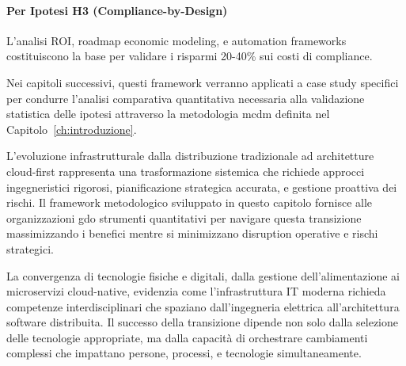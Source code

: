 \paragraph{Per Ipotesi H3 (Compliance-by-Design)}
L'analisi ROI, roadmap economic modeling, e automation frameworks costituiscono la base per validare i risparmi 20-40\% sui costi di compliance.

Nei capitoli successivi, questi framework verranno applicati a case study specifici per condurre l'analisi comparativa quantitativa necessaria alla validazione statistica delle ipotesi attraverso la metodologia \gls{mcdm} definita nel Capitolo~\ref{ch:introduzione}.

\vspace{1cm}

L'evoluzione infrastrutturale dalla distribuzione tradizionale ad architetture cloud-first rappresenta una trasformazione sistemica che richiede approcci ingegneristici rigorosi, pianificazione strategica accurata, e gestione proattiva dei rischi. Il framework metodologico sviluppato in questo capitolo fornisce alle organizzazioni \gls{gdo} strumenti quantitativi per navigare questa transizione massimizzando i benefici mentre si minimizzano disruption operative e rischi strategici.

La convergenza di tecnologie fisiche e digitali, dalla gestione dell'alimentazione ai microservizi cloud-native, evidenzia come l'infrastruttura IT moderna richieda competenze interdisciplinari che spaziano dall'ingegneria elettrica all'architettura software distribuita. Il successo della transizione dipende non solo dalla selezione delle tecnologie appropriate, ma dalla capacità di orchestrare cambiamenti complessi che impattano persone, processi, e tecnologie simultaneamente.